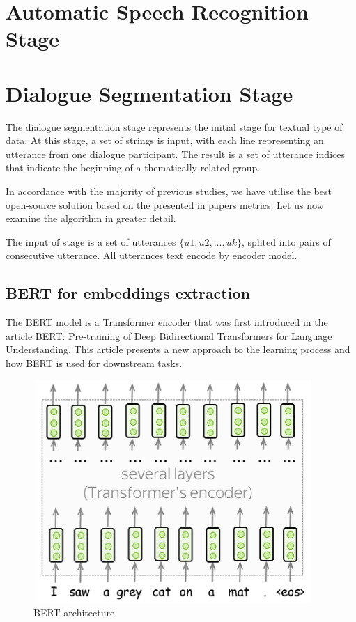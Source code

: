 \documentclass[PMI,VKR]{HSEUniversity}
\begin{document}
\section{Automatic Speech Recognition Stage}



\section{Dialogue Segmentation Stage}

The dialogue segmentation stage represents the initial stage for textual type of data. 
At this stage, a set of strings is input, with each line representing an utterance from one dialogue participant. 
The result is a set of utterance indices that indicate the beginning of a thematically related group. 

In accordance with the majority of previous studies, we have utilise the best open-source solution based on the presented in papers metrics. 
Let us now examine the algorithm in greater detail. 

The input of stage is a set of utterances $\{u1, u2, ..., uk\}$, splited into pairs of consecutive utterance. 
All utterances text encode by encoder model.

\subsection{BERT for embeddings extraction}

The BERT model is a Transformer encoder that was first introduced in the article BERT: Pre-training of Deep Bidirectional Transformers for Language Understanding\cite{bert:2018}.  
This article presents a new approach to the learning process and how BERT is used for downstream tasks.

\begin{figure}[h]
    \centering
    \includegraphics[scale=0.8]{img/bert.png}
    \caption{BERT architecture}
\end{figure}
\end{document}
